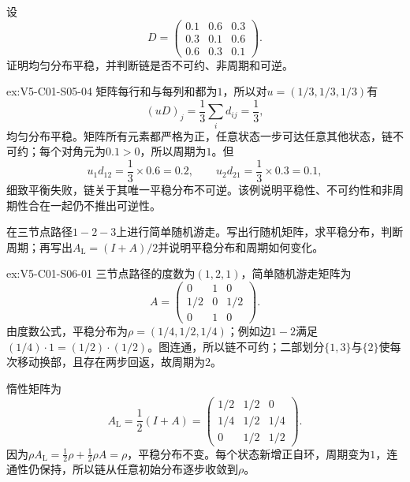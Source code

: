 \begin{SLChapterExercisePairSection}
\begin{exercise}\label{ex:V5-C01-S05-04}
设
\[
D=\begin{pmatrix}0.1&0.6&0.3\\0.3&0.1&0.6\\0.6&0.3&0.1\end{pmatrix}.
\]
证明均匀分布平稳，并判断链是否不可约、非周期和可逆。
\end{exercise}
\ifSLFullEdition
{}\label{sol:V5-C01-S05-04}
\begin{chapterexercisesolution}{ex:V5-C01-S05-04}
矩阵每行和与每列和都为$1$，所以对$u=(1/3,1/3,1/3)$有
\[
(uD)_j=\frac13\sum_i d_{ij}=\frac13,
\]
均匀分布平稳。矩阵所有元素都严格为正，任意状态一步可达任意其他状态，链不可约；每个对角元为$0.1>0$，所以周期为$1$。但
\[
u_1d_{12}=\frac13\times0.6=0.2,
\qquad
u_2d_{21}=\frac13\times0.3=0.1,
\]
细致平衡失败，链关于其唯一平稳分布不可逆。该例说明平稳性、不可约性和非周期性合在一起仍不推出可逆性。
\end{chapterexercisesolution}
\fi

\begin{exercise}\label{ex:V5-C01-S06-01}
在三节点路径$1-2-3$上进行简单随机游走。写出行随机矩阵，求平稳分布，判断周期；再写出$A_{\mathrm L}=(I+A)/2$并说明平稳分布和周期如何变化。
\end{exercise}
\ifSLFullEdition
{}\label{sol:V5-C01-S06-01}
\begin{chapterexercisesolution}{ex:V5-C01-S06-01}
\nopagebreak[4]
三节点路径的度数为$(1,2,1)$，简单随机游走矩阵为
\[
A=\begin{pmatrix}0&1&0\\1/2&0&1/2\\0&1&0\end{pmatrix}.
\]
由度数公式，平稳分布为$\rho=(1/4,1/2,1/4)$；例如边$1-2$满足$(1/4)\cdot1=(1/2)\cdot(1/2)$。图连通，所以链不可约；二部划分$\{1,3\}$与$\{2\}$使每次移动换部，且存在两步回返，故周期为$2$。

惰性矩阵为
\[
A_{\mathrm L}=\frac12(I+A)=
\begin{pmatrix}1/2&1/2&0\\1/4&1/2&1/4\\0&1/2&1/2\end{pmatrix}.
\]
因为$\rho A_{\mathrm L}=\tfrac12\rho+\tfrac12\rho A=\rho$，平稳分布不变。每个状态新增正自环，周期变为$1$，连通性仍保持，所以链从任意初始分布逐步收敛到$\rho$。
\end{chapterexercisesolution}
\fi


\end{SLChapterExercisePairSection}
